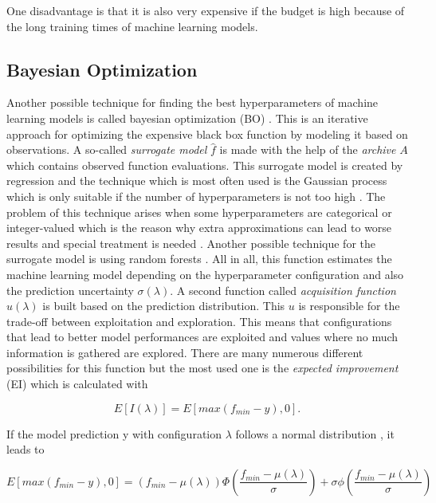 One disadvantage is that it is also very expensive if the budget is high because of the long training times of machine learning models. 


\subsection{Bayesian Optimization}

Another possible technique for finding the best hyperparameters of machine learning models is called bayesian optimization (BO) \cite{snoek2012practical}. This is an iterative approach for optimizing the expensive black box function by modeling it based on observations. A so-called \textit{surrogate model} $ \hat{f} $ is made with the help of the \textit{archive} $ A $ which contains observed function evaluations. This surrogate model is created by regression and the technique which is most often used is the Gaussian process \cite{bischl2021hyperparameter} which is only suitable if the number of hyperparameters is not too high \cite{andonie2019hyperparameter}. The problem of this technique arises when some hyperparameters are categorical or integer-valued which is the reason why extra approximations can lead to worse results and special treatment is needed \cite{garrido2020dealing}. Another possible technique for the surrogate model is using random forests \cite{hutter2011sequential}. All in all, this function estimates the machine learning model depending on the hyperparameter configuration and also the prediction uncertainty $ \sigma(\lambda) $. A second function called \textit{acquisition function} $ u(\lambda)$ is built based on the prediction distribution. This $ u $ is responsible for the trade-off between exploitation and exploration. This means that configurations that lead to better model performances are exploited and values where no much information is gathered are explored. There are many numerous different possibilities for this function  \cite{wilson2018maximizing} but the most used one is the \textit{expected improvement} (EI) which is calculated with

\begin{equation}
	E[I(\lambda)] = E[max(f_{min}-y), 0].
\end{equation}

If the model prediction y with configuration $ \lambda $ follows a normal distribution \cite{feurer2019hyperparameter}, it leads to 

\begin{equation}
	E[max(f_{min}-y), 0] = (f_{min}-\mu(\lambda)) \Phi(\frac{f_{min}-\mu(\lambda)}{\sigma}) + \sigma \phi (\frac{f_{min}-\mu(\lambda)}{\sigma})
\end{equation}

